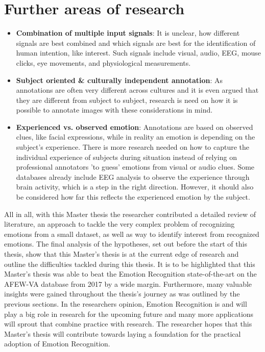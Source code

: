 \section{Further areas of research}
\begin{itemize}
    \item \textbf{Combination of multiple input signals}: It is unclear, how different signals are best combined and which signals are best for the identification of human intention, like interest. Such signals include visual, audio, EEG, mouse clicks, eye movements, and physiological measurements.
    \item \textbf{Subject oriented \& culturally independent annotation}: As annotations are often very different across cultures and it is even argued that they are different from subject to subject, research is need on how it is possible to annotate images with these considerations in mind. 
    \item \textbf{Experienced vs. observed emotion}: Annotations are based on observed clues, like facial expressions, while in reality an emotion is depending on the subject's experience. There is more research needed on how to capture the individual experience of subjects during situation instead of relying on professional annotators 'to guess' emotions from visual or audio clues. Some databases already include EEG analysis to observe the experience through brain activity, which is a step in the right direction. However, it should also be considered how far this reflects the experienced emotion by the subject.
\end{itemize}

All in all, with this Master thesis the researcher contributed a detailed review of literature, an approach to tackle the very complex problem of recognizing emotions from a small dataset, as well as way to identify interest from recognized emotions. The final analysis of the hypotheses, set out before the start of this thesis, show that this Master's thesis is at the current edge of research and outline the difficulties tackled during this thesis. It is to be highlighted that this Master's thesis was able to beat the Emotion Recognition state-of-the-art on the AFEW-VA database from 2017 by a wide margin. Furthermore, many valuable insights were gained throughout the thesis's journey as was outlined by the previous sections. 
\newline\newline
In the researchers opinion, Emotion Recognition is and will play a big role in research for the upcoming future and many more applications will sprout that combine practice with research. The researcher hopes that this Master's thesis will contribute towards laying a foundation for the practical adoption of Emotion Recognition.

